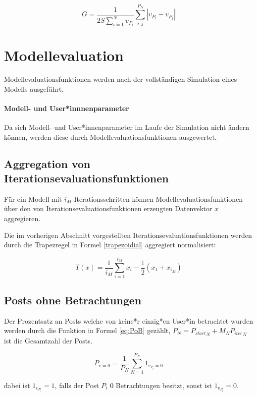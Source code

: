 \begin{equation}
G = \frac{1}{2S\sum_{i = 1}^{N}v_{P_i}}\sum_{i,j}^{P_N}|v_{P_i} - v_{P_j} |
\end{equation}


\section{Modellevaluation}

Modellevaluationsfunktionen werden nach der vollständigen Simulation eines Modells ausgeführt.

\paragraph{Modell- und User*innnenparameter} 

Da sich Modell- und User*innenparameter im Laufe der Simulation nicht ändern können, werden diese durch Modellevaluationsfunktionen ausgewertet.

\subsection{Aggregation von Iterationsevaluationsfunktionen}

Für ein Modell mit $i_M$ Iterationsschritten können 
Modellevaluationsfunktionen über den von Iterationsevaluationsfunktionen erzeugten Datenvektor $x$ aggregieren. 

Die im vorherigen Abschnitt vorgestellten Iterationsevaluationsfunktionen werden durch die Trapezregel in Formel \ref{trapezoidial} aggregiert normalisiert:

\begin{equation}
\label{trapezoidial}
T(x) = \frac{1}{i_M}\sum_{i = 1}^{i_M}x_i - \frac{1}{2}(x_1 + x_{i_M})
\end{equation}

\subsection{Posts ohne Betrachtungen}

Der Prozentsatz an Posts welche von keine*r einzig*en User*in betrachtet wurden werden durch die Funktion in Formel \ref{eq:PoB} gezählt,  $P_N = {P_{start}}_{N} + M_N {P_{iter}}_N$ ist die Gesamtzahl der Posts.

\begin{equation}
\label{eq:PoB}
P_{v = 0} = \frac{1}{P_N}\sum_{N = 1}^{P_N} 1_{v_{P_i} = 0}
\end{equation}

dabei ist $1_{v_{P_i}} = 1$, falls der Post $P_i$ $0$ Betrachtungen besitzt, sonst ist $1_{v_{P_i}} = 0$.

 











